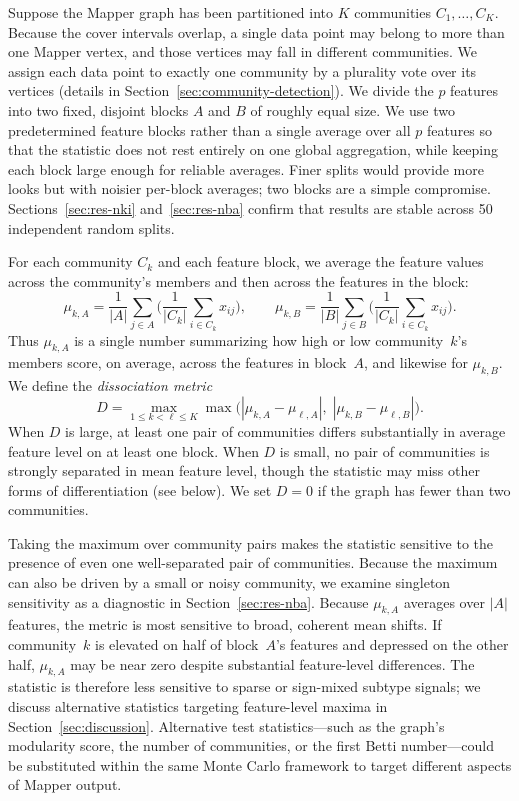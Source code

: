 \documentclass[hidelinks]{siamart251216}
\begin{document}
Suppose the Mapper graph has been partitioned into $K$ communities
$C_1, \ldots, C_K$.  Because the cover intervals overlap, a single
data point may belong to more than one Mapper vertex, and those
vertices may fall in different communities.  We assign each data point
to exactly one community by a plurality vote over its vertices
(details in Section~\ref{sec:community-detection}).  We divide the $p$ features into two fixed, disjoint blocks $A$ and $B$
of roughly equal size.  We use two predetermined feature blocks rather than a single average
over all $p$ features so that the statistic does not rest entirely on
one global aggregation, while keeping each block large enough for
reliable averages.  Finer splits would provide more looks but with
noisier per-block averages; two blocks are a simple compromise.
Sections~\ref{sec:res-nki} and~\ref{sec:res-nba} confirm that results
are stable across 50 independent random splits.

For each community $C_k$ and each feature block, we average the
feature values across the community's members and then across the
features in the block:
\begin{equation}\label{eq:block-mean}
  \mu_{k,A} = \frac{1}{|A|}
  \sum_{j \in A} \biggl(\frac{1}{|C_k|} \sum_{i \in C_k} x_{ij}\biggr),
  \qquad
  \mu_{k,B} = \frac{1}{|B|}
  \sum_{j \in B} \biggl(\frac{1}{|C_k|} \sum_{i \in C_k} x_{ij}\biggr).
\end{equation}
Thus $\mu_{k,A}$ is a single number summarizing how high or low
community~$k$'s members score, on average, across the features in
block~$A$, and likewise for $\mu_{k,B}$.  We define the
\emph{dissociation metric}
\begin{equation}\label{eq:dissociation}
  D = \max_{1 \le k < \ell \le K} \max\bigl(
    |\mu_{k,A} - \mu_{\ell,A}|,\;
    |\mu_{k,B} - \mu_{\ell,B}|
  \bigr).
\end{equation}
When $D$ is large, at least one pair of communities differs
substantially in average feature level on at least one block.  When
$D$ is small, no pair of communities is strongly separated in mean
feature level, though the statistic may miss other forms of
differentiation (see below).  We set $D = 0$ if the graph has fewer
than two communities.

Taking the maximum over community pairs makes the statistic sensitive
to the presence of even one well-separated pair of communities.
Because the maximum can also be driven by a small or noisy community,
we examine singleton sensitivity as a diagnostic in
Section~\ref{sec:res-nba}.  Because $\mu_{k,A}$ averages over $|A|$
features, the metric is most sensitive to broad, coherent mean shifts.
If community~$k$ is elevated on half of block~$A$'s features and
depressed on the other half, $\mu_{k,A}$ may be near zero despite
substantial feature-level differences.  The statistic is therefore less
sensitive to sparse or sign-mixed subtype signals; we discuss
alternative statistics targeting feature-level maxima in
Section~\ref{sec:discussion}.  Alternative test statistics---such as the graph's modularity score,
the number of communities, or the first Betti number---could be
substituted within the same Monte Carlo framework to target different
aspects of Mapper output.
\end{document}
